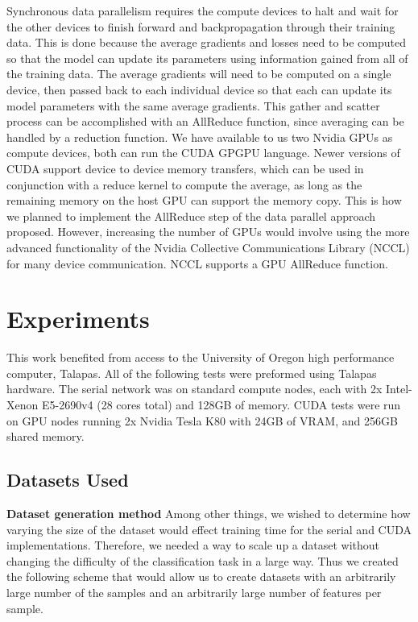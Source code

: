 \documentclass[11pt,a4paper]{article}
\begin{document}
Synchronous data parallelism requires the compute devices to halt and wait for the other devices to finish forward and backpropagation through their training data. This is done because the average gradients and losses need to be computed so that the model can update its parameters using information gained from all of the training data. The average gradients will need to be computed on a single device,
then passed back to each individual device so that each can update its model parameters with the same average gradients. This gather and scatter process can be accomplished with an AllReduce function, since averaging can be handled by a reduction function. We have available to us two Nvidia GPUs as compute devices, both can run the CUDA GPGPU language. Newer versions of CUDA support device to device memory transfers, which can be used in conjunction with a reduce kernel to compute the average, as long as the remaining memory on the host GPU can support the memory copy. This is how we planned to implement the AllReduce step of the data parallel approach proposed. However, increasing the number of GPUs would involve using the more advanced functionality of the Nvidia Collective Communications Library (NCCL) for many device communication. NCCL supports a GPU AllReduce function.  

\section{Experiments} \label{experiments}
This work benefited from access to the University of Oregon high performance computer, Talapas. All of the following tests were preformed using Talapas hardware.  The serial network was on standard compute nodes, each with 2x Intel-Xenon E5-2690v4 (28 cores total) and 128GB of memory. CUDA tests were run on GPU nodes running 2x Nvidia Tesla K80 with 24GB of VRAM, and 256GB shared memory.  

\subsection{Datasets Used} \label{data_used}
\noindent \textbf{Dataset generation method} Among other things, we wished to determine how varying the size of the dataset would effect training time for the serial and CUDA implementations. Therefore, we needed a way to scale up a dataset without changing the difficulty of the classification task in a large way. Thus we created the following scheme that would allow us to create datasets with an arbitrarily large number of the samples and an arbitrarily large number of features per sample. 
\end{document}
